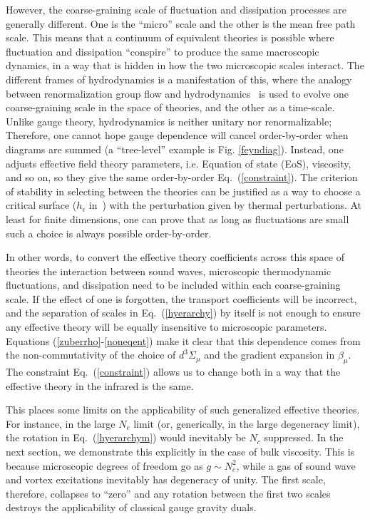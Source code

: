 \documentclass[12pt,onecolumn,showpacs,amssymb,aps,nofootinbib,floatfix]{revtex4-2}
\renewcommand{\eqref}[1]{Eq.~(\ref{#1})}
\begin{document}
	However, the coarse-graining scale of fluctuation and dissipation processes are generally different. One is the ``micro'' scale and the other is the mean free path scale. This means that a continuum of equivalent theories is possible where fluctuation and dissipation ``conspire'' to produce the same macroscopic dynamics, in a way that is hidden in how the two microscopic scales interact.  
	The different frames of hydrodynamics is a manifestation of this, where the analogy between renormalization group flow and hydrodynamics~\cite{rghydro} is used to evolve one coarse-graining scale in the space of theories, and the other as a time-scale.
	Unlike gauge theory, hydrodynamics is neither unitary nor renormalizable;  Therefore, one cannot hope gauge dependence will cancel order-by-order when diagrams are summed (a ``tree-level'' example is Fig. \ref{feyndiag}).   Instead, one adjusts effective field theory parameters, i.e. Equation of state (EoS), viscosity, and so on, so they give the same order-by-order \eqref{constraint}. The criterion of stability in selecting between the theories can be justified as a way to choose a critical surface ($h_\epsilon$ in~\cite{spohn}) with the perturbation given by thermal perturbations. At least for finite dimensions, one can prove that as long as fluctuations are small such a choice is always possible order-by-order.     
	
	In other words, to convert the effective theory coefficients across this space of theories the interaction between sound waves, microscopic thermodynamic fluctuations, and dissipation need to be included within each coarse-graining scale.  If the effect of one is forgotten, the transport coefficients will be incorrect, and the separation of scales in \eqref{hyerarchy} by itself is not enough to ensure any effective theory will be equally insensitive to microscopic parameters. Equations (\ref{zuberrho}-\ref{noneqent}) make it clear that this dependence comes from the non-commutativity of the choice of $d^3\Sigma_\mu$ and the gradient expansion in $\beta_\mu$.  The constraint \eqref{constraint} allows us to change both in a way that the effective theory in the infrared is the same.
	
	This places some limits on the applicability of such generalized effective theories.  For instance, in the large $N_c$ limit (or, generically, in the large degeneracy limit), the rotation in \eqref{hyerarchym} would inevitably be $N_c$ suppressed. In the next section, we demonstrate this explicitly in the case of bulk viscosity. This is because microscopic degrees of freedom go as $g\sim N_c^2$, while a gas of sound wave and vortex excitations inevitably has degeneracy of unity. The first scale, therefore, collapses to ``zero'' and any rotation between the first two scales destroys the applicability of classical gauge gravity duals.
	
\end{document}
